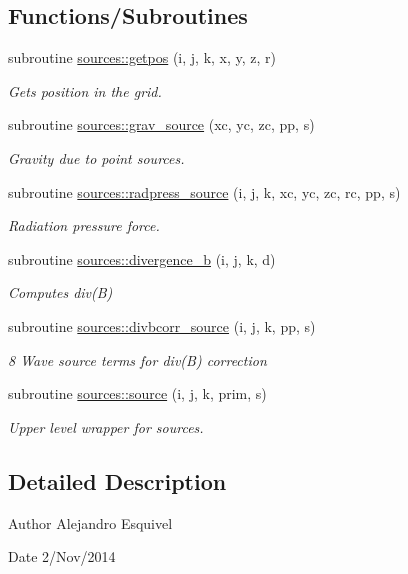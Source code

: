 \subsection*{Functions/\+Subroutines}
\begin{DoxyCompactItemize}
\item 
subroutine \hyperlink{namespacesources_a378a8116ae16db2efa853343f88156d3}{sources\+::getpos} (i, j, k, x, y, z, r)
\begin{DoxyCompactList}\small\item\em Gets position in the grid. \end{DoxyCompactList}\item 
subroutine \hyperlink{namespacesources_aef9f6ca4bc770f0e768dbbba91b67415}{sources\+::grav\+\_\+source} (xc, yc, zc, pp, s)
\begin{DoxyCompactList}\small\item\em Gravity due to point sources. \end{DoxyCompactList}\item 
subroutine \hyperlink{namespacesources_a36b548c9c578b74c5f439ffaec7d3a9a}{sources\+::radpress\+\_\+source} (i, j, k, xc, yc, zc, rc, pp, s)
\begin{DoxyCompactList}\small\item\em Radiation pressure force. \end{DoxyCompactList}\item 
subroutine \hyperlink{namespacesources_a0478795277b4f25ec62d8e3e1f06611e}{sources\+::divergence\+\_\+b} (i, j, k, d)
\begin{DoxyCompactList}\small\item\em Computes div(\+B) \end{DoxyCompactList}\item 
subroutine \hyperlink{namespacesources_a9c2d37de3b878eff7693a25d3dc3fe91}{sources\+::divbcorr\+\_\+source} (i, j, k, pp, s)
\begin{DoxyCompactList}\small\item\em 8 Wave source terms for div(\+B) correction \end{DoxyCompactList}\item 
subroutine \hyperlink{namespacesources_a6a66dd1f8baf424ff64a30112f39c632}{sources\+::source} (i, j, k, prim, s)
\begin{DoxyCompactList}\small\item\em Upper level wrapper for sources. \end{DoxyCompactList}\end{DoxyCompactItemize}


\subsection{Detailed Description}
\begin{DoxyAuthor}{Author}
Alejandro Esquivel 
\end{DoxyAuthor}
\begin{DoxyDate}{Date}
2/\+Nov/2014 
\end{DoxyDate}
